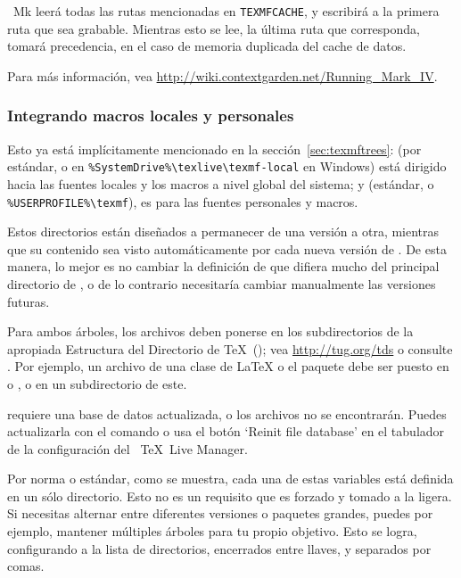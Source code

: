 \documentclass{article}
\begin{document}
\ConTeXt\ Mk leerá todas las rutas mencionadas en
\verb+TEXMFCACHE+, y escribirá a la primera ruta que sea grabable.
Mientras esto se lee, la última ruta que corresponda, tomará precedencia,
en el caso de memoria duplicada del cache de datos. 

Para más información, vea 
\url{http://wiki.contextgarden.net/Running_Mark_IV}.

\subsubsection{Integrando macros locales y personales}
\label{sec:local-personal-macros}

Esto ya está implícitamente mencionado en la
sección~\ref{sec:texmftrees}: 
 (por estándar,
 o en
\verb|%SystemDrive%\texlive\texmf-local| en Windows)
está dirigido hacia las fuentes locales y los macros a nivel global
del sistema; y  (estándar,  o
\verb|%USERPROFILE%\texmf|), es para las fuentes personales y macros.

Estos directorios están diseñados a permanecer de una versión a otra,
mientras que su contenido sea visto automáticamente por cada nueva
versión de \TL{}. De esta manera, lo mejor es no cambiar la definición
de  que difiera mucho del principal directorio de
\TL{}, o de lo contrario necesitaría cambiar manualmente las versiones
futuras. 


Para ambos árboles, los archivos deben ponerse en los subdirectorios
de la apropiada Estructura del Directorio de \TeX\ (\TDS); vea
\url{http://tug.org/tds} o consulte
. Por ejemplo, un archivo de una
clase de \LaTeX{}
o 
el paquete debe ser puesto en  o
, o en un subdirectorio de este.

 requiere una base de datos actualizada, o los
archivos no se encontrarán. Puedes actualizarla con el comando
 o usa el botón `Reinit file database' en el
tabulador de la configuración del \GUI\ \TeX\ Live Manager. 

Por norma o estándar, como se muestra, cada una de estas variables está
definida en un sólo directorio. Esto no es
un requisito que es forzado y tomado a la ligera. Si necesitas alternar entre
diferentes versiones o paquetes grandes, puedes por ejemplo, 
mantener múltiples árboles para tu propio
objetivo. Esto se logra, configurando  a la lista de directorios, 
encerrados entre llaves, y separados por comas.
\end{document}
